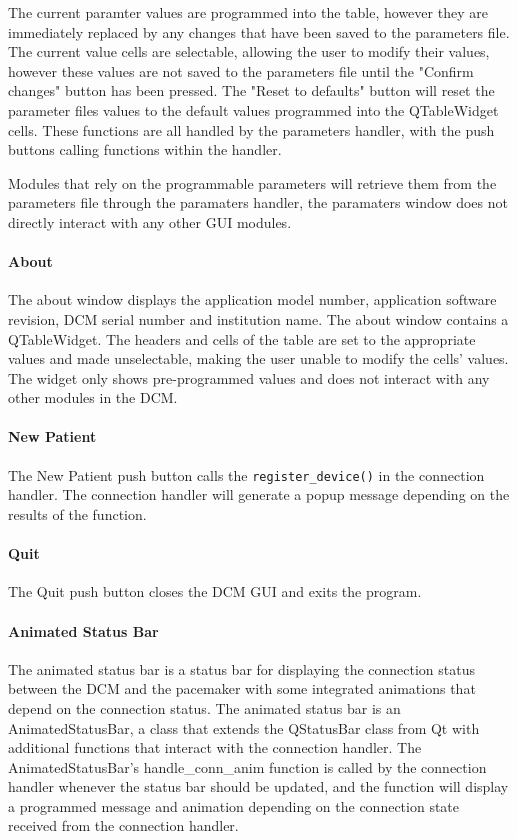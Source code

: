 \documentclass[12pt]{article}
\begin{document}
The current paramter values are programmed into the table, however they are immediately replaced by any changes that have been saved to the parameters file. The current value cells are selectable, allowing the user to modify their values, however these values are not saved to the parameters file until the "Confirm changes" button has been pressed. The "Reset to defaults" button will reset the parameter files values to the default values programmed into the QTableWidget cells. These functions are all handled by the parameters handler, with the push buttons calling functions within the handler.

Modules that rely on the programmable parameters will retrieve them from the parameters file through the paramaters handler, the paramaters window does not directly interact with any other GUI modules.

\paragraph{About}
The about window displays the application model number, application software revision, DCM serial number and institution name. The about window contains a QTableWidget. The headers and cells of the table are set to the appropriate values and made unselectable, making the user unable to modify the cells' values. The widget only shows pre-programmed values and does not interact with any other modules in the DCM.

\paragraph{New Patient}
The New Patient push button calls the \verb|register_device()| in the connection handler. The connection handler will generate a popup message depending on the results of the function.

\paragraph{Quit}
The Quit push button closes the DCM GUI and exits the program.

\paragraph{Animated Status Bar}
The animated status bar is a status bar for displaying the connection status between the DCM and the pacemaker with some integrated animations that depend on the connection status. The animated status bar is an AnimatedStatusBar, a class that extends the QStatusBar class from Qt with additional functions that interact with the connection handler. The AnimatedStatusBar's handle\_conn\_anim function is called by the connection handler whenever the status bar should be updated, and the function will display a programmed message and animation depending on the connection state received from the connection handler.
\end{document}
